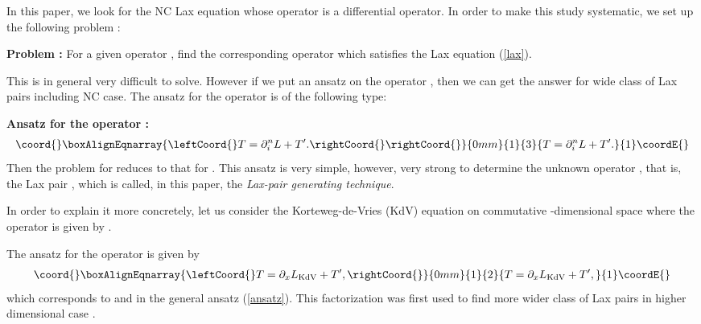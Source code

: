 \documentclass[a4paper,12pt]{article}\setlength{\topmargin}{-1cm}
\begin{document}
In this paper, we look for the NC Lax equation
whose operator \coordHE{} is a differential operator.
In order to make this study systematic,
we set up the following problem :

\vspace{3mm}
\noindent
{\bf Problem :}
For a given operator \coordHE{}, 
find the corresponding operator \coordHE{}
which satisfies the Lax equation (\ref{lax}).
\vspace{3mm}

This is in general very difficult to solve.
However if we put an ansatz on the operator \coordHE{},
then we can get the answer 
for wide class of Lax pairs
including NC case.
The ansatz for the operator \coordHE{} is of the following type:

\vspace{3mm}
\noindent
{\bf Ansatz for the operator \coordHE{} :}
\begin{eqnarray}\coord{}\boxAlignEqnarray{\leftCoord{}
\label{ansatz}
T=\partial_i^n L+T^\prime.\rightCoord{}
\rightCoord{}}{0mm}{1}{3}{
T=\partial_i^n L+T^\prime.
}{1}\coordE{}\end{eqnarray}
\noindent
Then the problem for \coordHE{} reduces to that for \coordHE{}.
This ansatz is very simple, however, very strong
to determine the unknown operator \coordHE{}, 
that is, the Lax pair \coordHE{},
which is called, in this paper, the
{\it Lax-pair generating technique}.

In order to explain it more concretely,
let us consider the Korteweg-de-Vries (KdV) 
equation on commutative \coordHE{}-dimensional space
where the operator \coordHE{} is given 
by \coordHE{}.

The ansatz for the operator \coordHE{} is given by
\begin{eqnarray}\coord{}\boxAlignEqnarray{\leftCoord{}
T=\partial_x L_{\scriptsize\mbox{KdV}} +T^\prime,
\label{ansatz_KdV}
\rightCoord{}}{0mm}{1}{2}{
T=\partial_x L_{\scriptsize\mbox{KdV}} +T^\prime,
}{1}\coordE{}\end{eqnarray}
which corresponds to \coordHE{} and \coordHE{} in
the general ansatz (\ref{ansatz}).
This factorization 
was first used to find more wider class of
Lax pairs in higher dimensional case \cite{ToYu}.
\end{document}

